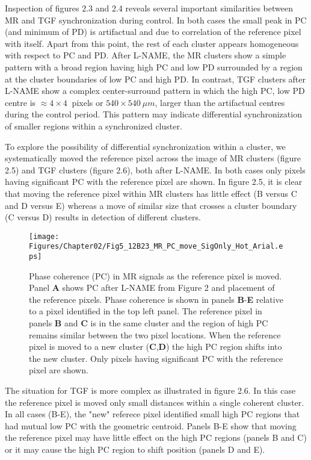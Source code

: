 	Inspection of figures 2.3 and 2.4 reveals several important similarities between MR and TGF synchronization during control. In both cases the small peak in PC (and minimum of PD) is artifactual and due to correlation of the reference pixel with itself. Apart from this point, the rest of each cluster appears homogeneous with respect to PC and PD. After L-NAME, the MR clusters show a simple pattern with a broad region having high PC and low PD surrounded by a region at the cluster boundaries of low PC and high PD. In contrast, TGF clusters after L-NAME show a complex center-surround pattern in which the high PC, low PD centre is $\approx 4\times 4 \ $ pixels or $540\times 540 \  \mu m$, larger than the artifactual centres during the control period. This pattern may indicate differential synchronization of smaller regions within a synchronized cluster. 
	
	To explore the possibility of differential synchronization within a cluster, we systematically moved the reference pixel across the image of MR clusters (figure 2.5) and TGF clusters (figure 2.6), both after L-NAME. In both cases only pixels having significant PC with the reference pixel are shown. In figure 2.5, it is clear that moving the reference pixel within MR clusters has little effect (B versus C and D versus E) whereas a move of similar size that crosses a cluster boundary (C versus D) results in detection of different clusters. 
\begin{figure}[H]
\begin{center}
\texttt{[image: Figures/Chapter02/Fig5\_12B23\_MR\_PC\_move\_SigOnly\_Hot\_Arial.eps]}
\caption[Effect of reference pixel location on myogenic phase coherence]{Phase coherence (PC) in MR signals as the reference pixel is moved. Panel \textbf{A} shows PC after L-NAME from Figure 2 and placement of the reference pixels. Phase coherence is shown in panels \textbf{B}-\textbf{E} relative to a pixel identified in the top left panel. The reference pixel in panels \textbf{B} and \textbf{C} is in the same cluster and the region of high PC remains similar between the two pixel locations. When the reference pixel is moved to a new cluster (\textbf{C},\textbf{D}) the high PC region shifts into the new cluster. Only pixels having significant PC with the reference pixel are shown.}
\end{center}
\end{figure}	
The situation for TGF is more complex as illustrated in figure 2.6.  In this case the reference pixel is moved only small distances within a single coherent cluster. In all cases (B-E), the "new" referece pixel identified small high PC regions that had mutual low PC with the geometric centroid. Panels B-E show that moving the reference pixel may have little effect on the high PC regions (panels B and C) or it may cause the high PC region to shift position (panels D and E).

